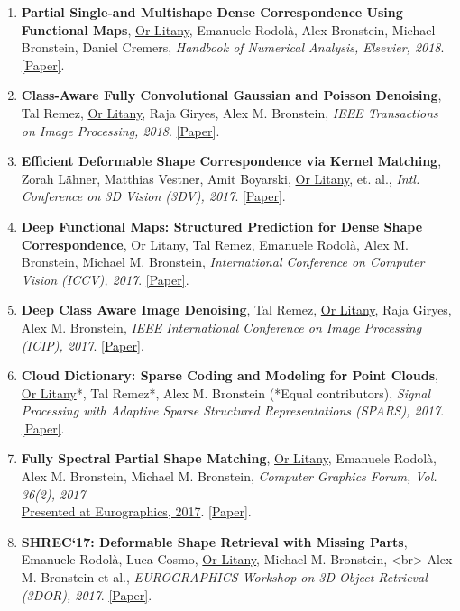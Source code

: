 \begin{enumerate}[leftmargin=*]
    \item \textbf{Partial Single-and Multishape Dense Correspondence Using Functional Maps}, \underline{Or Litany}, Emanuele Rodolà, Alex Bronstein, Michael Bronstein, Daniel Cremers, \textit{Handbook of Numerical Analysis, Elsevier, 2018}. \href{https://www.sciencedirect.com/science/article/pii/S1570865918300097}{[Paper]}.
    \item \textbf{Class-Aware Fully Convolutional Gaussian and Poisson Denoising}, Tal Remez, \underline{Or Litany}, Raja Giryes, Alex M. Bronstein, \textit{IEEE Transactions on Image Processing, 2018}. \href{https://arxiv.org/pdf/1808.06562.pdf}{[Paper]}.
    \item \textbf{Efficient Deformable Shape Correspondence via Kernel Matching}, Zorah Lähner, Matthias Vestner, Amit Boyarski, \underline{Or Litany}, et. al., \textit{Intl. Conference on 3D Vision (3DV), 2017}. \href{https://arxiv.org/pdf/1707.08991.pdf}{[Paper]}.
    \item \textbf{Deep Functional Maps: Structured Prediction for Dense Shape Correspondence}, \underline{Or Litany}, Tal Remez, Emanuele Rodolà, Alex M. Bronstein, Michael M. Bronstein, \textit{International Conference on Computer Vision (ICCV), 2017}. \href{http://vision.in.tum.de/_media/spezial/bib/litany-iccv17.pdf}{[Paper]}.
    \item \textbf{Deep Class Aware Image Denoising}, Tal Remez, \underline{Or Litany}, Raja Giryes, Alex M. Bronstein, \textit{IEEE International Conference on Image Processing (ICIP), 2017}. \href{https://arxiv.org/abs/1701.01698}{[Paper]}.
    \item \textbf{Cloud Dictionary: Sparse Coding and Modeling for Point Clouds}, \underline{Or Litany}*, Tal Remez*, Alex M. Bronstein (*Equal contributors), \textit{Signal Processing with Adaptive Sparse Structured Representations (SPARS), 2017}. \href{https://arxiv.org/pdf/1612.04956v1}{[Paper]}.
    \item \textbf{Fully Spectral Partial Shape Matching}, \underline{Or Litany},  Emanuele Rodolà, Alex M. Bronstein, Michael M. Bronstein, \textit{Computer Graphics Forum, Vol. 36(2), 2017}\\ \underline{Presented at Eurographics, 2017}. \href{http://vision.in.tum.de/_media/spezial/bib/litany-eg17.pdf}{[Paper]}.
    \item \textbf{SHREC`17: Deformable Shape Retrieval with Missing Parts}, Emanuele Rodolà, Luca Cosmo, \underline{Or Litany}, Michael M. Bronstein, <br> Alex M. Bronstein et al., \textit{EUROGRAPHICS Workshop on 3D Object Retrieval (3DOR), 2017}. \href{http://vision.in.tum.de/_media/spezial/bib/shrec17partial.pdf}{[Paper]}.

\end{enumerate}
